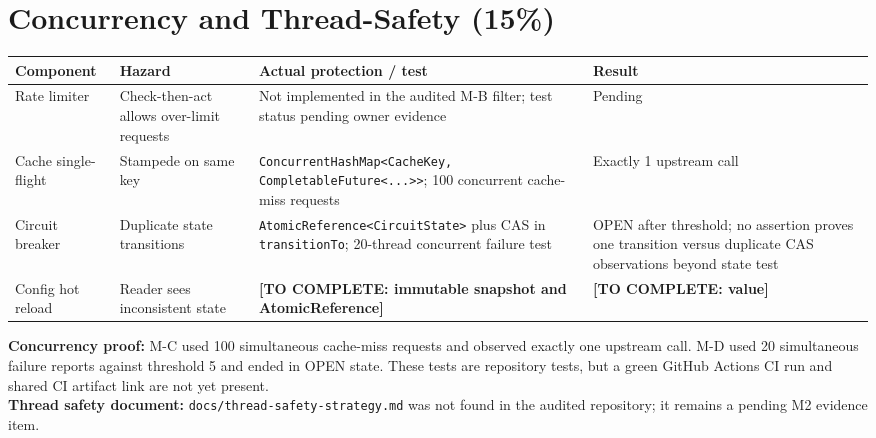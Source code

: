 \documentclass[12pt,a4paper]{article}
\newcommand{\todo}[1]{\textcolor{red!70!black}{\textbf{[TO COMPLETE: #1]}}}
\newcommand{\evidence}[1]{\texttt{#1}}
\begin{document}
\section{Concurrency and Thread-Safety (15\%)}\label{sec:concurrency}
\begin{longtable}{L{3cm} L{4cm} L{4.3cm} L{1.5cm}}\toprule
\textbf{Component} & \textbf{Hazard} & \textbf{Actual protection / test} & \textbf{Result}\\\midrule\endhead
Rate limiter & Check-then-act allows over-limit requests & Not implemented in the audited M-B filter; test status pending owner evidence & Pending\\
Cache single-flight & Stampede on same key & \texttt{ConcurrentHashMap<CacheKey, CompletableFuture<...>>}; 100 concurrent cache-miss requests & Exactly 1 upstream call\\
Circuit breaker & Duplicate state transitions & \texttt{AtomicReference<CircuitState>} plus CAS in \texttt{transitionTo}; 20-thread concurrent failure test & OPEN after threshold; no assertion proves one transition versus duplicate CAS observations beyond state test\\
Config hot reload & Reader sees inconsistent state & \todo{immutable snapshot and AtomicReference} & \todo{value}\\\bottomrule\end{longtable}
\textbf{Concurrency proof:} M-C used 100 simultaneous cache-miss requests and observed exactly one upstream call. M-D used 20 simultaneous failure reports against threshold 5 and ended in OPEN state. These tests are repository tests, but a green GitHub Actions CI run and shared CI artifact link are not yet present.\\
\textbf{Thread safety document:} \evidence{docs/thread-safety-strategy.md} was not found in the audited repository; it remains a pending M2 evidence item.
\end{document}
